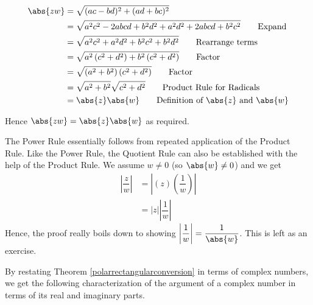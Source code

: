 \begin{align*}
\abs{zw} & =  \sqrt{(ac-bd)^2+(ad+bc)^2}  \\
	 & =  \sqrt{a^2c^2 - 2abcd + b^2d^2 + a^2d^2 +2abcd + b^2c^2}  \tag*{Expand} \\
	 & = \sqrt{a^2c^2 + a^2d^2 + b^2c^2 + b^2d^2}  \tag*{Rearrange terms} \\
	 & =  \sqrt{a^2\left(c^2+d^2\right) + b^2\left(c^2+d^2\right)}  \tag*{Factor} \\
	 & =  \sqrt{\left(a^2+b^2\right)\left(c^2+d^2\right)}  \tag*{Factor}\\
	 & = \sqrt{a^2+b^2} \sqrt{c^2+d^2}  \tag*{Product Rule for Radicals} \\
	 & =  \abs{z} \abs{w}  \tag*{Definition of $\abs{z}$ and $\abs{w}$}
\end{align*}
		 
Hence $\abs{zw} = \abs{z} \abs{w}$ as required.  

\smallskip


The Power Rule essentially follows from repeated application of the Product Rule.
Like the Power Rule, the Quotient Rule can also be established with the help of the Product Rule. We assume $w \neq 0$ (so $\abs{w} \neq 0$) and we get
\begin{align*}
\left\vert \dfrac{z}{w} \right\rvert &  =  \left\lvert (z) \left( \dfrac{1}{w} \right) \right\rvert  \\[3pt] 
							& =  |z| \left\lvert \dfrac{1}{w}\right\rvert \tag*{Product Rule.}
\end{align*}
Hence, the proof really boils down to showing $\left\lvert \dfrac{1}{w} \right\rvert = \dfrac{1}{\abs{w}}$.  This is left as an exercise.

\smallskip

By restating Theorem \ref{polarrectangularconversion} in terms of complex numbers, we get the following characterization of the argument of a complex number in terms of its real and imaginary parts.

\smallskip


